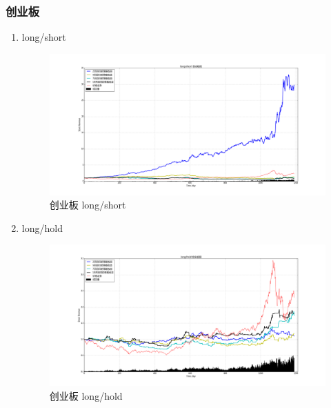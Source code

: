 \documentclass[12pt,a4paper]{article}
\begin{document}
\subsubsection{创业板}
\begin{enumerate}
\item long/short 
\begin{figure}[H]
	\centering
	\includegraphics[width=1.0\textwidth]{img_r_1/cyb.png}
	\caption{创业板 long/short}
\end{figure}
\item long/hold 
\begin{figure}[H]
	\centering
	\includegraphics[width=1.0\textwidth]{img_r_1/cyb_1.png}
	\caption{创业板 long/hold }
\end{figure}
\end{enumerate}
\end{document}
